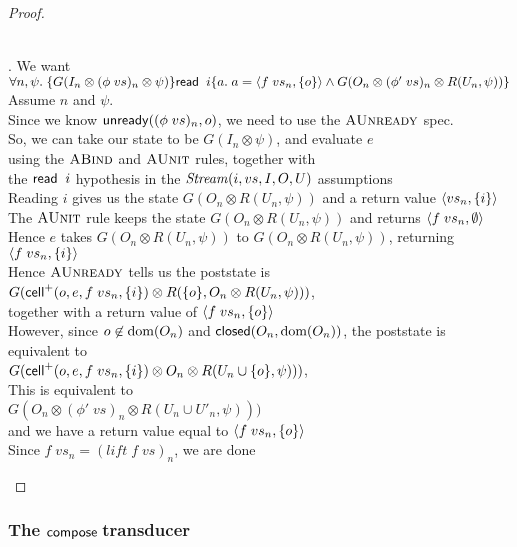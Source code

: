 \begin{proof}
\begin{enumerate}
\begin{tabbedproof}
  \\ . We want $\forall n, \psi.\; \{{G(I_n \otimes (\phi\;vs)_n \otimes \psi)}\}{\mathsf{read}\;\;i}\{{a}.\;{a = \left<{f\;vs_n},{\{{o}\}}\right> \land G(O_n \otimes (\phi'\;vs)_n \otimes R(U_n, \psi))}\}$ \\
  \ooo Assume $n$ and $\psi$. \\
  \ooo Since we know $\mathsf{unready}({(\phi\;vs)_n}, {o})$, we need to use the $\textsc{AUnready}$ spec. \\
  \ooo So, we can take our state to be $G(I_n \otimes \psi)$, and evaluate $e$ \\
  \ooo using the $\textsc{ABind}$ and $\textsc{AUnit}$ rules, together with \\
  \ooo the $\mathsf{read}\;\;i$ hypothesis in the $\mathit{Stream}(i, vs, I, O, U)$ assumptions \\
  \ooo Reading $i$ gives us the state $G(O_n \otimes R(U_n, \psi))$ and a return value $\left<{vs_n},{\{{i}\}}\right>$ \\ 
  \ooo The $\textsc{AUnit}$ rule keeps the state $G(O_n \otimes R(U_n, \psi))$ and returns $\left<{f\;vs_n},{\emptyset}\right>$ \\
  \ooo Hence $e$ takes $G(O_n \otimes R(U_n, \psi))$ to $G(O_n \otimes R(U_n, \psi))$, returning $\left<{f\;vs_n},{\{{i}\}}\right>$ \\
  \ooo Hence $\textsc{AUnready}$ tells us the poststate is $G(\mathsf{cell}^{+}({o}, {e}, {f\;vs_n}, {\{{i}\}}) \otimes R(\{{o}\}, O_n \otimes R(U_n, \psi)))$, \\
  \ooo together with a return value of $\left<{f\;vs_n},{\{{o}\}}\right>$ \\ 
  \ooo However, since $o \not\in \mbox{dom}({O_n})$ and $\mathsf{closed}({O_n}, {\mbox{dom}({O_n})})$, the poststate is equivalent to \\
  \ooo $G(\mathsf{cell}^{+}({o}, {e}, {f\;vs_n}, {\{{i}\}}) \otimes O_n \otimes R(U_n \cup \{{o}\}, \psi)))$, \\
  \ooo This is equivalent to  \\
  \ooo $G(O_n \otimes (\phi'\;vs)_n \otimes R(U_n \cup U'_n, \psi)))$  \\
  \ooo and we have a return value equal to $\left<{f\;vs_n},{\{{o}\}}\right>$ \\
  \ooo Since $f\;vs_n = (\mathit{lift}\;f\;vs)_n$, we are done

  \end{tabbedproof}
\end{enumerate}
\end{proof}

\subsubsection{The $\mathsf{compose}\;$transducer}

